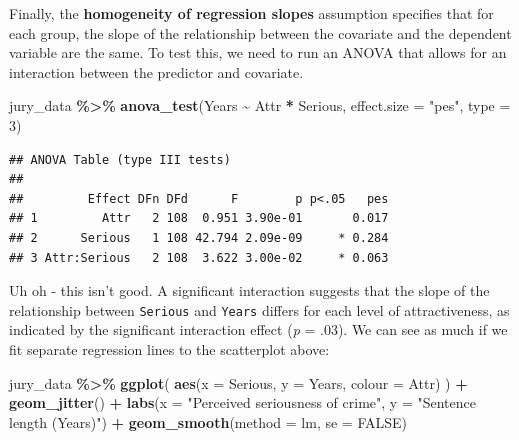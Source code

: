 \documentclass[
]{book}
\newenvironment{Shaded}{\begin{snugshade}}{\end{snugshade}}
\newcommand{\AttributeTok}[1]{\textcolor[rgb]{0.13,0.29,0.53}{#1}}
\newcommand{\ConstantTok}[1]{\textcolor[rgb]{0.56,0.35,0.01}{#1}}
\newcommand{\DecValTok}[1]{\textcolor[rgb]{0.00,0.00,0.81}{#1}}
\newcommand{\FunctionTok}[1]{\textcolor[rgb]{0.13,0.29,0.53}{\textbf{#1}}}
\newcommand{\NormalTok}[1]{#1}
\newcommand{\SpecialCharTok}[1]{\textcolor[rgb]{0.81,0.36,0.00}{\textbf{#1}}}
\newcommand{\StringTok}[1]{\textcolor[rgb]{0.31,0.60,0.02}{#1}}
\begin{document}
Finally, the \textbf{homogeneity of regression slopes} assumption specifies that for each group, the slope of the relationship between the covariate and the dependent variable are the same. To test this, we need to run an ANOVA that allows for an interaction between the predictor and covariate.

\begin{Shaded}
\begin{Highlighting}[]
\NormalTok{jury\_data }\SpecialCharTok{\%\textgreater{}\%}
  \FunctionTok{anova\_test}\NormalTok{(Years }\SpecialCharTok{\textasciitilde{}}\NormalTok{ Attr }\SpecialCharTok{*}\NormalTok{ Serious, }\AttributeTok{effect.size =} \StringTok{"pes"}\NormalTok{, }\AttributeTok{type =} \DecValTok{3}\NormalTok{)}
\end{Highlighting}
\end{Shaded}

\begin{verbatim}
## ANOVA Table (type III tests)
## 
##         Effect DFn DFd      F        p p<.05   pes
## 1         Attr   2 108  0.951 3.90e-01       0.017
## 2      Serious   1 108 42.794 2.09e-09     * 0.284
## 3 Attr:Serious   2 108  3.622 3.00e-02     * 0.063
\end{verbatim}

Uh oh - this isn't good. A significant interaction suggests that the slope of the relationship between \texttt{Serious} and \texttt{Years} differs for each level of attractiveness, as indicated by the significant interaction effect (\emph{p} = .03). We can see as much if we fit separate regression lines to the scatterplot above:

\begin{Shaded}
\begin{Highlighting}[]
\NormalTok{jury\_data }\SpecialCharTok{\%\textgreater{}\%}
  \FunctionTok{ggplot}\NormalTok{(}
    \FunctionTok{aes}\NormalTok{(}\AttributeTok{x =}\NormalTok{ Serious, }\AttributeTok{y =}\NormalTok{ Years, }\AttributeTok{colour =}\NormalTok{ Attr)}
\NormalTok{  ) }\SpecialCharTok{+} 
  \FunctionTok{geom\_jitter}\NormalTok{() }\SpecialCharTok{+} 
  \FunctionTok{labs}\NormalTok{(}\AttributeTok{x =} \StringTok{"Perceived seriousness of crime"}\NormalTok{, }\AttributeTok{y =} \StringTok{"Sentence length (Years)"}\NormalTok{) }\SpecialCharTok{+}
  \FunctionTok{geom\_smooth}\NormalTok{(}\AttributeTok{method =}\NormalTok{ lm, }\AttributeTok{se =} \ConstantTok{FALSE}\NormalTok{)}
\end{Highlighting}
\end{Shaded}
\end{document}
